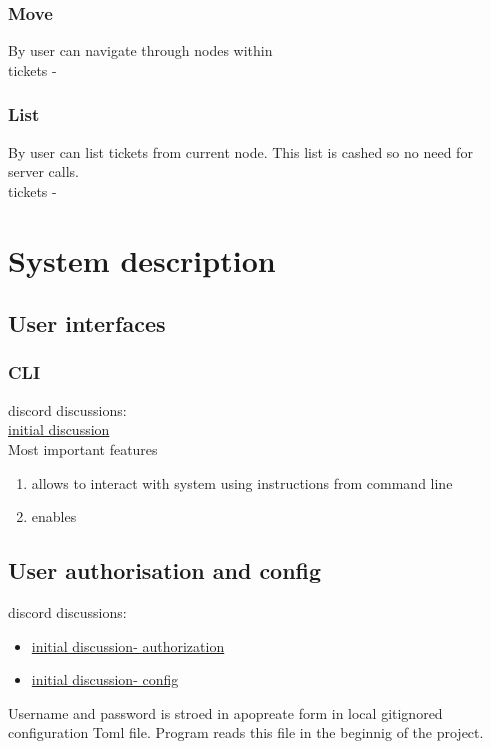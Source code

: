 \subsubsection{Move}\label{GF:CRUD:MOV}
By  user can navigate through nodes within \\
tickets - 
\subsubsection{List}\label{GF:CRUD:LIST}
By  user can list tickets from current node. This list is cashed so no 
need for server calls.\\
tickets - 

\newpage
\section{System description}
\subsection{User interfaces}\label{UI:POC}

\subsubsection{CLI}
discord discussions:\\
\href{https://discord.com/channels/892473074434310144/896321419498098689}{initial discussion}\\
Most important features
\begin{enumerate}
    \item allows to interact with system using instructions from command line
    \item enables 
\end{enumerate}

\subsection{User authorisation and config}\label{AUTH:POC}\label{CONFIG:POC}
discord discussions:
\begin{itemize}
    \item \href{https://discord.com/channels/892473074434310144/896357478600671272}{initial discussion- authorization}
    \item \href{https://discord.com/channels/892473074434310144/896360600542789642}{initial discussion- config}
\end{itemize}
Username and password is stroed in apopreate form in local gitignored configuration Toml file. 
Program reads this file in the beginnig of the project. 
